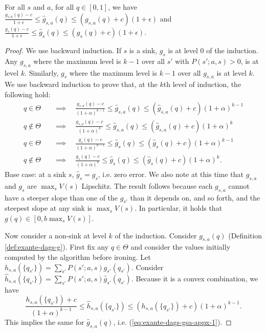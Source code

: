 \begin{lemma} \label{lemma:exante-dags-approx-gs}
  For all $s$ and $a$, for all $q \in [0,1]$, we have $\frac{g_{s,a}(q) - c}{1+\epsilon} \leq \hat{g}_{s,a}(q) \leq (g_{s,a}(q) + c)(1+\epsilon)$ and $\frac{g_{s}(q) - c}{1+\epsilon} \leq \hat{g}_{s}(q) \leq (g_{s}(q) + c)(1+\epsilon)$.
\end{lemma}
\begin{proof}
  We use backward induction.
  If $s$ is a sink, $g_s$ is at level $0$ of the induction.
  Any $g_{s,a}$ where the maximum level is $k-1$ over all $s'$ with $P(s';a,s) > 0$, is at level $k$.
  Similarly, $g_s$ where the maximum level is $k-1$ over all $g_{s,a}$ is at level $k$.
  We use backward induction to prove that, at the $k$th level of induction, the following hold:
  \begin{align}
    q \in \Theta \quad &\implies \quad \frac{g_{s,a}(q) - c}{(1+\alpha)^{k-1}} \leq \hat{g}_{s,a}(q) \leq (\hat{g}_{s,a}(q) + c)(1+\alpha)^{k-1}  \label{eq:exante-dags-gsa-appx-1} \\
    q \not\in\Theta \quad &\implies \quad \frac{g_{s,a}(q) - c}{(1+\alpha)^{k}} \leq \hat{g}_{s,a}(q) \leq (\hat{g}_{s,a}(q) + c)(1+\alpha)^{k}   \label{eq:exante-dags-gsa-appx-2}\\
    q \in \Theta \quad &\implies \quad \frac{g_{s}(q) - c}{(1+\alpha)^{k-1}} \leq \hat{g}_{s}(q) \leq (\hat{g}_{s}(q) + c)(1+\alpha)^{k-1}  \\
    q \not\in\Theta \quad &\implies \quad \frac{g_{s}(q) - c}{(1+\alpha)^{k}} \leq \hat{g}_{s}(q) \leq (\hat{g}_{s}(q) + c)(1+\alpha)^{k} .
  \end{align}
  Base case: at a sink $s$, $\hat{g}_s = g_s$, i.e. zero error.
  We also note at this time that $g_{s,a}$ and $g_{s}$ are $\max_s V(s)$ Lipschitz.
  The result follows because each $g_{s,a}$ cannot have a steeper slope than one of the $g_{s'}$ than it depends on, and so forth, and the steepest slope at any sink is $\max_s V(s)$.
  In particular, it holds that $g(q) \in [0, b \max_s V(s)]$.

  Now consider a non-sink at level $k$ of the induction.
  Consider $g_{s,a}(q)$ (Definition \ref{def:exante-dags-g}).
  First fix any $q \in \Theta$ and consider the values initially computed by the algorithm before ironing.
  Let $h_{s,a}(\{q_{s'}\}) = \sum_{s'} P(s';a,s) g_{s'}(q_{s'})$.
  Consider $\hat{h}_{s,a}(\{q_{s'}\}) = \sum_{s'} P(s';a,s) \hat{g}_{s'}(q_{s'})$.
  Because it is a convex combination, we have
    \[ \frac{h_{s,a}(\{q_{s'}\}) + c}{(1+\alpha)^{k-1}} \leq \hat{h}_{s,a}(\{q_{s'}\}) \leq (h_{s,a}(\{q_{s'}\}) + c)(1+\alpha)^{k-1} . \]
  This implies the same for $\hat{g}_{s,a}(q)$, i.e. (\ref{eq:exante-dags-gsa-appx-1}).
  


\end{proof}
